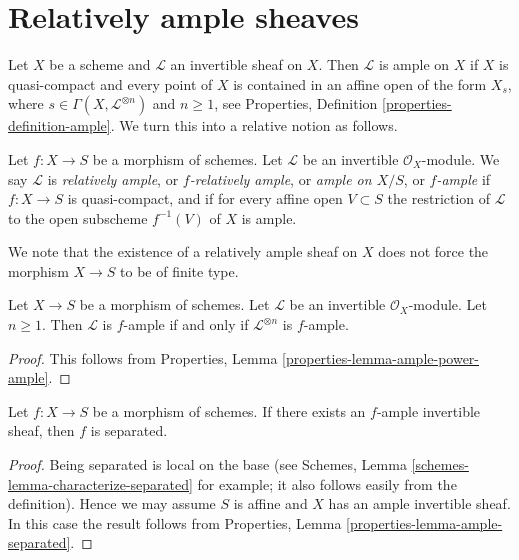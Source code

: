 \section{Relatively ample sheaves}
\label{section-relatively-ample}

\noindent
Let $X$ be a scheme and $\mathcal{L}$ an invertible sheaf on $X$.
Then $\mathcal{L}$ is ample on $X$ if $X$ is quasi-compact and
every point of $X$ is contained in an affine open of the form
$X_s$, where $s \in \Gamma(X, \mathcal{L}^{\otimes n})$ and $n \geq 1$, see
Properties, Definition \ref{properties-definition-ample}.
We turn this into a relative notion as follows.

\begin{definition}
\label{definition-relatively-ample}
\begin{reference}
\cite[II Definition 4.6.1]{EGA}
\end{reference}
Let $f : X \to S$ be a morphism of schemes.
Let $\mathcal{L}$ be an invertible $\mathcal{O}_X$-module.
We say $\mathcal{L}$ is {\it relatively ample}, or {\it $f$-relatively ample},
or {\it ample on $X/S$}, or {\it $f$-ample} if $f : X \to S$
is quasi-compact, and if for every affine open $V \subset S$
the restriction of $\mathcal{L}$ to the open subscheme
$f^{-1}(V)$ of $X$ is ample.
\end{definition}

\noindent
We note that the existence of a relatively ample sheaf on $X$ does not
force the morphism $X \to S$ to be of finite type.

\begin{lemma}
\label{lemma-ample-power-ample}
Let $X \to S$ be a morphism of schemes.
Let $\mathcal{L}$ be an invertible $\mathcal{O}_X$-module.
Let $n \geq 1$. Then $\mathcal{L}$ is $f$-ample if and only if
$\mathcal{L}^{\otimes n}$ is $f$-ample.
\end{lemma}

\begin{proof}
This follows from Properties, Lemma \ref{properties-lemma-ample-power-ample}.
\end{proof}

\begin{lemma}
\label{lemma-relatively-ample-separated}
Let $f : X \to S$ be a morphism of schemes.
If there exists an $f$-ample invertible sheaf, then
$f$ is separated.
\end{lemma}

\begin{proof}
Being separated is local on the base (see
Schemes, Lemma \ref{schemes-lemma-characterize-separated} for example;
it also follows easily from the definition).
Hence we may assume $S$ is affine and $X$
has an ample invertible sheaf. In this case the
result follows from
Properties, Lemma \ref{properties-lemma-ample-separated}.
\end{proof}

